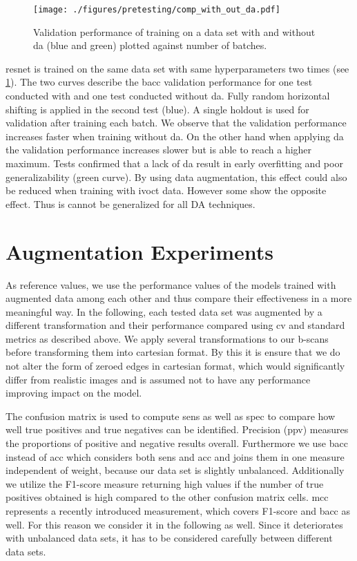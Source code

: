 \begin{figure}[H]
    \centering
    \texttt{[image: ./figures/pretesting/comp\_with\_out\_da.pdf]}
    \caption[Validation performance with(-out) \acrshort{da}]{Validation performance of training on a data set with and without \acrshort{da} (blue and green) plotted against number of batches.}
    \label{fig:comp_with_out_da}
\end{figure}
\Acrshort{resnet} is trained on the same data set with same hyperparameters two times (see \cref{fig:comp_with_out_da}). The two curves describe the \acrshort{bacc} validation performance for one test conducted with and one test conducted without \acrshort{da}. Fully random horizontal shifting is applied in the second test (blue). A single holdout is used for validation after training each batch. We observe that the validation performance increases faster when training without \acrshort{da}. On the other hand when applying \acrshort{da} the validation performance increases slower but is able to reach a higher maximum. Tests confirmed that a lack of \acrshort{da} result in early overfitting and poor generalizability (green curve). By using data augmentation, this effect could also be reduced when training with \acrshort{ivoct} data. However some show the opposite effect. Thus is cannot be generalized for all DA techniques.


\section{Augmentation Experiments}

As reference values, we use the performance values of the models trained with augmented data among each other and thus compare their effectiveness in a more meaningful way. In the following, each tested data set was augmented by a different transformation and their performance compared using \acrshort{cv} and standard metrics as described above. We apply several transformations to our \glspl{b-scan} before transforming them into cartesian format. By this it is ensure that we do not alter the form of zeroed edges in cartesian format, which would significantly differ from realistic images and is assumed not to have any performance improving impact on the model.

The confusion matrix is used to compute \acrshort{sens} as well as \acrshort{spec} to compare how well true positives and true negatives can be identified. Precision (\acrshort{ppv}) measures the proportions of positive and negative results overall. Furthermore we use \acrshort{bacc} instead of \acrshort{acc} which considers both \acrshort{sens} and \acrshort{acc} and joins them in one measure independent of weight, because our data set is slightly unbalanced. Additionally we utilize the F1-score measure returning high values if the number of true positives obtained is high compared to the other confusion matrix cells. \Acrshort{mcc} represents a recently introduced measurement, which covers F1-score and \acrshort{bacc} as well. For this reason we consider it in the following as well. Since it deteriorates with unbalanced data sets, it has to be considered carefully between different data sets. \cite{Chicco.2020}

